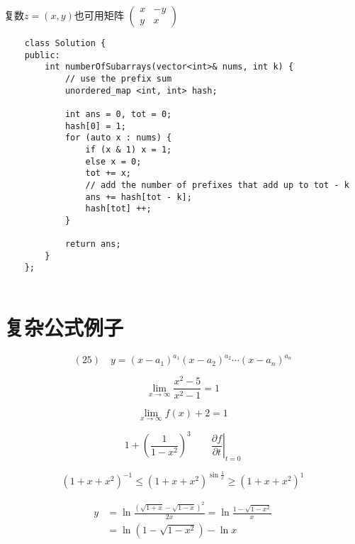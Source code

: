 \documentclass{article}
\begin{document}
    复数$z = (x, y)$也可用矩阵 
    \begin{math}
    \left(\begin{smallmatrix}
    x & -y \\
    y & x   
    \end{smallmatrix}\right) %
    \end{math}

    \begin{verbatim}
    class Solution {
    public:
        int numberOfSubarrays(vector<int>& nums, int k) {
            // use the prefix sum
            unordered_map <int, int> hash;
             
            int ans = 0, tot = 0;
            hash[0] = 1;
            for (auto x : nums) {
                if (x & 1) x = 1;
                else x = 0;
                tot += x;
                // add the number of prefixes that add up to tot - k
                ans += hash[tot - k]; 
                hash[tot] ++;
            }
            
            return ans;
        }
    };
            
    \end{verbatim}


\section{复杂公式例子}
    \[
    (25)\quad y=\left(x-a_{1}\right)^{a_{1}}\left(x-a_{2}\right)^{a_{2}} \cdots\left(x-a_{n}\right)^{a_{n}}
    \]

    \[
    \lim _{x \rightarrow \infty} \frac{x^{2}-5}{x^{2}-1}=1
    \]

    $$\lim _{x \rightarrow \infty} {f(x)+ 2} = 1$$

    \[
    1 + \left(\frac{1}{1-x^{2}}\right)^3 \qquad
    \left. \frac{\partial f}{\partial t}
    \right|_{t = 0}
    \]

    \[(1 + x + x^2)^{-1} \leqslant (1 + x + x^2)^{\sin\frac{1}{x}} \geqslant (1+x+x^2)^{1}\] %

    \[
    \begin{aligned} y &=\ln \frac{(\sqrt{1+x}-\sqrt{1-x})^{2}}{2 x}=\ln \frac{1-\sqrt{1-x^{2}}}{x} \\ &=\ln (1-\sqrt{1-x^{2}})-\ln x \end{aligned}
    \]
\end{document}
